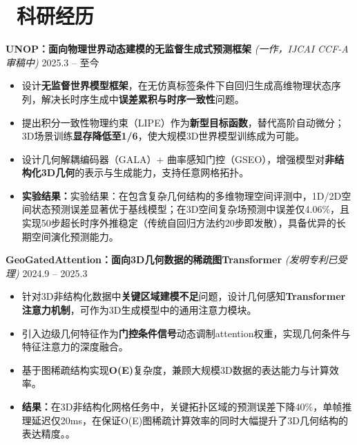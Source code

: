 \documentclass[11pt]{article}
\newlength{\interProjectSpacing}
\newcommand{\projectsep}{\vspace{\interProjectSpacing}}
\begin{document}
\section{\makebox[\widthof{\faUsers}][c]{\color{CVBlue}\faUsers}\ 
科研经历}

\textbf{UNOP：面向物理世界动态建模的无监督生成式预测框架} 
\textit{(一作，IJCAI CCF-A 审稿中)} 
\hfill 2025.3 -- 至今
\begin{itemize}
    \item 设计\textbf{无监督世界模型框架}，在无仿真标签条件下自回归生成高维物理状态序列，解决长时序生成中\textbf{误差累积与时序一致性}问题。
    \item 提出积分一致性物理约束（LIPE）作为\textbf{新型目标函数}，替代高阶自动微分；3D场景训练\textbf{显存降低至1/6}，使大规模3D世界模型训练成为可能。
    \item 设计几何解耦编码器（GALA）+ 曲率感知门控（GSEO），增强模型对\textbf{非结构化3D几何}的表示与生成能力，支持任意网格拓扑。
    \item \textbf{实验结果：}实验结果：在包含复杂几何结构的多维物理空间评测中，1D/2D空间状态预测误差显著优于基线模型；在3D空间复杂场预测中误差仅4.06\%，且实现50步超长时序外推稳定（传统自回归方法约20步即发散），具备优异的长期空间演化预测能力。
\end{itemize}


\textbf{GeoGatedAttention：面向3D几何数据的稀疏图Transformer} 
\textit{(发明专利已受理)} \hfill 2024.9 -- 2025.3
\begin{itemize}
    \item 针对3D非结构化数据中\textbf{关键区域建模不足}问题，设计几何感知\textbf{Transformer注意力机制}，可作为3D生成模型中的通用注意力模块。
    \item 引入边级几何特征作为\textbf{门控条件信号}动态调制attention权重，实现几何条件与特征注意力的深度融合。
    \item 基于图稀疏结构实现\textbf{O(E)}复杂度，兼顾大规模3D数据的表达能力与计算效率。
    \item \textbf{结果：}在3D非结构化网格任务中，关键拓扑区域的预测误差下降40\%，单帧推理延迟仅20ms，在保证O(E)图稀疏计算效率的同时大幅提升了3D几何结构的表达精度。。
\end{itemize}

\end{document}
